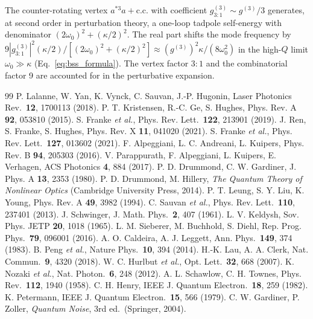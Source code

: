 \documentclass[11pt]{article}
\begin{document}
The counter-rotating vertex $a^{*3}a+\mathrm{c.c.}$ with coefficient
$g^{(3)}_{3:1}\sim g^{(3)}/3$ generates, at second order in
perturbation theory, a one-loop tadpole self-energy with denominator
$(2\omega_0)^2+(\kappa/2)^2$.  The real part shifts the mode frequency
by $9|g^{(3)}_{3:1}|^2(\kappa/2)/[(2\omega_0)^2+(\kappa/2)^2]\approx
(g^{(3)})^2\kappa/(8\omega_0^2)$ in the high-$Q$ limit
$\omega_0\gg\kappa$ (Eq.~\ref{eq:bss_formula}).  The vertex factor
$3:1$ and the combinatorial factor 9 are accounted for in the
perturbative expansion.

\begin{thebibliography}{99}
 P. Lalanne, W. Yan, K. Vynck, C. Sauvan, J.-P. Hugonin,
  Laser Photonics Rev.\ \textbf{12}, 1700113 (2018).
 P. T. Kristensen, R.-C. Ge, S. Hughes,
  Phys. Rev. A \textbf{92}, 053810 (2015).
 S. Franke \textit{et al.},
  Phys. Rev. Lett.\ \textbf{122}, 213901 (2019).
 J. Ren, S. Franke, S. Hughes,
  Phys. Rev. X \textbf{11}, 041020 (2021).
 S. Franke \textit{et al.},
  Phys. Rev. Lett.\ \textbf{127}, 013602 (2021).
 F. Alpeggiani, L. C. Andreani, L. Kuipers,
  Phys. Rev. B \textbf{94}, 205303 (2016).
 V. Parappurath, F. Alpeggiani, L. Kuipers, E. Verhagen,
  ACS Photonics \textbf{4}, 884 (2017).
 P. D. Drummond, C. W. Gardiner,
  J. Phys. A \textbf{13}, 2353 (1980).
 P. D. Drummond, M. Hillery,
  \textit{The Quantum Theory of Nonlinear Optics}
  (Cambridge University Press, 2014).
 P. T. Leung, S. Y. Liu, K. Young,
  Phys. Rev. A \textbf{49}, 3982 (1994).
 C. Sauvan \textit{et al.},
  Phys. Rev. Lett.\ \textbf{110}, 237401 (2013).
 J. Schwinger, J. Math. Phys.\ \textbf{2}, 407 (1961).
 L. V. Keldysh,
  Sov. Phys. JETP \textbf{20}, 1018 (1965).
 L. M. Sieberer, M. Buchhold, S. Diehl,
  Rep. Prog. Phys.\ \textbf{79}, 096001 (2016).
 A. O. Caldeira, A. J. Leggett,
  Ann. Phys.\ \textbf{149}, 374 (1983).
 B. Peng \textit{et al.}, Nature Phys.\ \textbf{10}, 394 (2014).
 H.-K. Lau, A. A. Clerk, Nat. Commun.\ \textbf{9}, 4320 (2018).
 W. C. Hurlbut \textit{et al.},
  Opt. Lett.\ \textbf{32}, 668 (2007).
 K. Nozaki \textit{et al.}, Nat. Photon.\ \textbf{6}, 248 (2012).
 A. L. Schawlow, C. H. Townes,
  Phys. Rev.\ \textbf{112}, 1940 (1958).
 C. H. Henry, IEEE J. Quantum Electron.\ \textbf{18}, 259 (1982).
 K. Petermann, IEEE J. Quantum Electron.\ \textbf{15}, 566 (1979).
 C. W. Gardiner, P. Zoller,
  \textit{Quantum Noise}, 3rd ed.\ (Springer, 2004).
\end{thebibliography}
\end{document}
